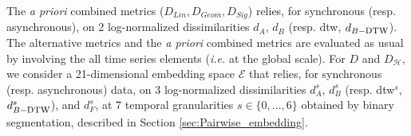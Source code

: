 The \textit{a priori} combined metrics ($D_{Lin}, D_{Geom}, D_{Sig}$) relies, for synchronous (resp. asynchronous), on 2 log-normalized dissimilarities $d_{A}$, $d_{B}$ (resp. {\sc dtw}, $d_{B-\mbox{\sc dtw}}$). The alternative metrics and the \textit{a priori} combined metrics are evaluated  as usual by involving the all time series elements ({\it i.e.} at the global scale). For $D$ and $D_{\mathcal{H}}$, we consider a 21-dimensional embedding space  $\mathcal{E}$ that relies, for synchronous (resp. asynchronous) data, on 3 log-normalized dissimilarities $d_{A}^{s}$, $d_{B}^{s}$ (resp. {\sc dtw}$^{s}$, $d_{B-\mbox{\sc dtw}}^{s}$), and $d_{F}^{s}$, at 7 temporal granularities $s \in \{0,...,6\}$ obtained by binary segmentation, described in Section \ref{sec:Pairwise_embedding}.

